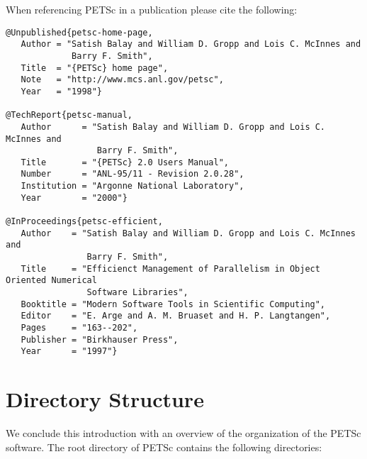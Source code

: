 When referencing PETSc in a publication please cite the following:
\begin{verbatim}
@Unpublished{petsc-home-page,
   Author = "Satish Balay and William D. Gropp and Lois C. McInnes and
             Barry F. Smith",
   Title  = "{PETSc} home page",
   Note   = "http://www.mcs.anl.gov/petsc",
   Year   = "1998"}

@TechReport{petsc-manual,
   Author      = "Satish Balay and William D. Gropp and Lois C. McInnes and 
                  Barry F. Smith",
   Title       = "{PETSc} 2.0 Users Manual",
   Number      = "ANL-95/11 - Revision 2.0.28",
   Institution = "Argonne National Laboratory",
   Year        = "2000"}

@InProceedings{petsc-efficient,
   Author    = "Satish Balay and William D. Gropp and Lois C. McInnes and 
                Barry F. Smith",
   Title     = "Efficienct Management of Parallelism in Object Oriented Numerical 
                Software Libraries",
   Booktitle = "Modern Software Tools in Scientific Computing",
   Editor    = "E. Arge and A. M. Bruaset and H. P. Langtangen",
   Pages     = "163--202",
   Publisher = "Birkhauser Press",
   Year      = "1997"}
\end{verbatim}



\section{Directory Structure}

We conclude this introduction with an overview of the
organization of the PETSc software.  
The root directory of PETSc contains the following directories:

